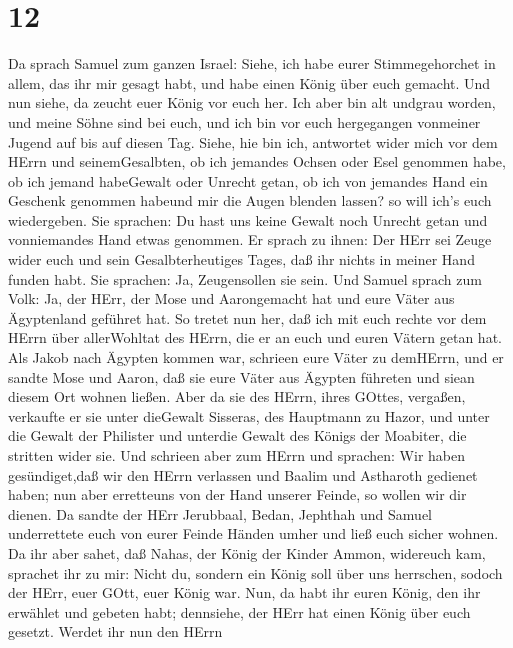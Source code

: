 \hypertarget{section-11}{%
\section{12}\label{section-11}}

 Da sprach Samuel zum ganzen Israel: Siehe, ich habe eurer
Stimmegehorchet in allem, das ihr mir gesagt habt, und habe einen König
über euch gemacht.  Und nun siehe, da zeucht euer König vor
euch her. Ich aber bin alt undgrau worden, und meine Söhne sind bei
euch, und ich bin vor euch hergegangen vonmeiner Jugend auf bis auf
diesen Tag.  Siehe, hie bin ich, antwortet wider mich vor
dem HErrn und seinemGesalbten, ob ich jemandes Ochsen oder Esel genommen
habe, ob ich jemand habeGewalt oder Unrecht getan, ob ich von jemandes
Hand ein Geschenk genommen habeund mir die Augen blenden lassen? so will
ich's euch wiedergeben.  Sie sprachen: Du hast uns keine
Gewalt noch Unrecht getan und vonniemandes Hand etwas genommen.
 Er sprach zu ihnen: Der HErr sei Zeuge wider euch und sein
Gesalbterheutiges Tages, daß ihr nichts in meiner Hand funden habt. Sie
sprachen: Ja, Zeugensollen sie sein.  Und Samuel sprach zum
Volk: Ja, der HErr, der Mose und Aarongemacht hat und eure Väter aus
Ägyptenland geführet hat.  So tretet nun her, daß ich mit
euch rechte vor dem HErrn über allerWohltat des HErrn, die er an euch
und euren Vätern getan hat.  Als Jakob nach Ägypten kommen
war, schrieen eure Väter zu demHErrn, und er sandte Mose und Aaron, daß
sie eure Väter aus Ägypten führeten und siean diesem Ort wohnen ließen.
 Aber da sie des HErrn, ihres GOttes, vergaßen, verkaufte er
sie unter dieGewalt Sisseras, des Hauptmann zu Hazor, und unter die
Gewalt der Philister und unterdie Gewalt des Königs der Moabiter, die
stritten wider sie.  Und schrieen aber zum HErrn und
sprachen: Wir haben gesündiget,daß wir den HErrn verlassen und Baalim
und Astharoth gedienet haben; nun aber erretteuns von der Hand unserer
Feinde, so wollen wir dir dienen.  Da sandte der HErr
Jerubbaal, Bedan, Jephthah und Samuel underrettete euch von eurer Feinde
Händen umher und ließ euch sicher wohnen.  Da ihr aber
sahet, daß Nahas, der König der Kinder Ammon, widereuch kam, sprachet
ihr zu mir: Nicht du, sondern ein König soll über uns herrschen, sodoch
der HErr, euer GOtt, euer König war.  Nun, da habt ihr
euren König, den ihr erwählet und gebeten habt; dennsiehe, der HErr hat
einen König über euch gesetzt.  Werdet ihr nun den HErrn
